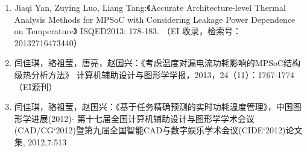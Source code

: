 \begin{paper}
\begin{enumerate}
	

	\item Jiaqi Yan, Zuying Luo, Liang Tang:《Accurate Architecture-level Thermal Analysis Methods for MPSoC with Considering Leakage Power Dependence on Temperature》 ISQED2013: 178-183. （EI 收录，检索号：20132716473440）
	\item 闫佳琪，骆祖莹，唐亮，赵国兴：《考虑温度对漏电流功耗影响的MPSoC结构级热分析方法》 计算机辅助设计与图形学学报，2013，24（11）：1767-1774 （EI源刊）
	\item 闫佳琪，骆祖莹，赵国兴：《基于任务精确预测的实时功耗温度管理》，中国图形学进展(2012)- 第十七届全国计算机辅助设计与图形学学术会议(CAD/CG`2012)暨第九届全国智能CAD与数字娱乐学术会议(CIDE`2012)论文集, 2012,7:513


  \end{enumerate}

\end{paper}
